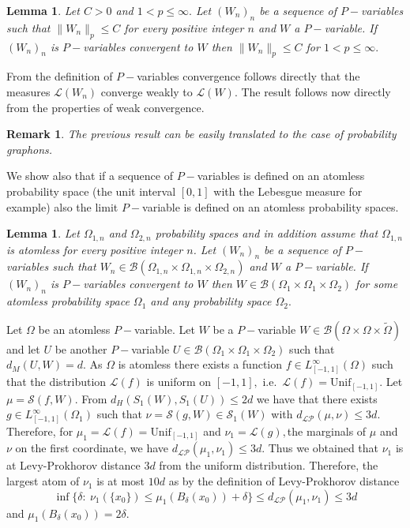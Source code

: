 \documentclass[11pt]{article}
\newtheorem{lemma}[theorem]{Lemma}
\newtheorem{remark}[theorem]{Remark}
\newcommand{\cB}{{\mathcal B}}  %
\newcommand{\cL}{{\mathcal L}}  %
\begin{document}
\begin{lemma}
Let $C>0$ and $1<p\leq \infty.$ Let $(W_n)_n$ be a sequence of $P-$variables such that $\|W_n\|_p\leq C$ for every positive integer $n$ and $W$ a $P-$variable. If  $(W_n)_n$ is $P-$variables convergent to $W$ then $\|W_n\|_p\leq C$ for $1<p\leq \infty.$
\end{lemma}
\proof
From the definition of $P-$variables convergence follows directly that the measures $\mathcal{L}(W_n)$ converge weakly to $\mathcal{L}(W).$ The result follows now directly from the properties of weak convergence.
\endproof

\begin{remark}
The previous result can be easily translated to the case of probability graphons.
\end{remark}

We show also that if a sequence of $P-$variables is defined on an atomless probability space (the unit interval $[0,1]$ with the Lebesgue measure for example) also the limit $P-$variable is defined on an atomless probability spaces.

\begin{lemma}\label{LemmPsetsClosSym}
Let $\Omega_{1,n}$ and $\Omega_{2,n}$ probability spaces and in addition assume that $\Omega_{1,n}$ is atomless for every positive integer $n$. Let $(W_n)_n$ be a sequence of $P-$variables such that $W_n\in \cB(\Omega_{1,n}\times\Omega_{1,n} \times \Omega_{2,n} )$ and $W$ a $P-$variable. If $(W_n)_n$ is $P-$variables convergent to $W$ then $W\in \cB(\Omega_1\times\Omega_1\times\Omega_2)$ for some atomless probability space $\Omega_1$ and any probability space $\Omega_2.$
\end{lemma}
\proof
Let $\Omega$ be an atomless $P-$variable. Let $W$ be a $P-$variable $W\in \mathcal{B}(\Omega\times\Omega\times \widetilde \Omega)$ and let $U$ be another $P-$variable $U \in \mathcal{B}\left(\Omega_1\times \Omega_1 \times  \Omega_2\right)$ such that $d_M(U, W)=d.$ As $\Omega$ is atomless there exists a function $f \in L_{[-1,1]}^{\infty}(\Omega)$ such that the distribution $\cL(f)$ is uniform on $[-1,1],$ i.e.\ $\cL(f)=\text{Unif}_{[-1,1]}.$ Let $\mu=\mathcal{S}(f,W).$ From $d_H\left(S_1(W), S_1(U)\right) \leq 2d$ we have that there exists $g\in L_{[-1,1]}^{\infty}(\Omega_1) $ such that $\nu=\mathcal{S}(g,W) \in \mathcal{S}_1(W)$ with $d_{\mathcal{LP}}(\mu, \nu) \leq 3 d.$ Therefore, for $\mu_1=\mathcal{L}(f)=\text{Unif}_{[-1,1]}$ and $\nu_1=\mathcal{L}(g),$the marginals of $\mu$ and $\nu$ on the first coordinate, we have $d_{\mathcal{LP}}\left(\mu_1, \nu_1\right) \leq 3 d.$ Thus we obtained that $\nu_1$ is at Levy-Prokhorov distance $3 d$ from the uniform distribution. Therefore, the largest atom of $\nu_1$ is at most $10d$ as by the definition of Levy-Prokhorov distance
$$
\inf\{\delta:\ \nu_1(\{x_0\})\leq \mu_1(B_{\delta}(x_0))+\delta\}\leq d_{\mathcal{LP}}(\mu_1,\nu_1)\leq 3d
$$
and $\mu_1(B_{\delta}(x_0))=2\delta$. 
\end{document}
